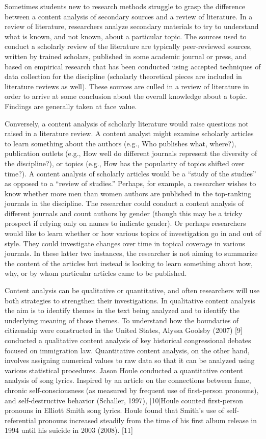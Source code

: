 Sometimes students new to research methods struggle to grasp the difference between a content analysis of secondary sources and a review of literature. In a review of literature, researchers analyze secondary materials to try to understand what is known, and not known, about a particular topic. The sources used to conduct a scholarly review of the literature are typically peer-reviewed sources, written by trained scholars, published in some academic journal or press, and based on empirical research that has been conducted using accepted techniques of data collection for the discipline (scholarly theoretical pieces are included in literature reviews as well). These sources are culled in a review of literature in order to arrive at some conclusion about the overall knowledge about a topic. Findings are generally taken at face value.

Conversely, a content analysis of scholarly literature would raise questions not raised in a literature review. A content analyst might examine scholarly articles to learn something about the authors (e.g., Who publishes what, where?), publication outlets (e.g., How well do different journals represent the diversity of the discipline?), or topics (e.g., How has the popularity of topics shifted over time?). A content analysis of scholarly articles would be a ``study of the studies'' as opposed to a ``review of studies.'' Perhaps, for example, a researcher wishes to know whether more men than women authors are published in the top-ranking journals in the discipline. The researcher could conduct a content analysis of different journals and count authors by gender (though this may be a tricky prospect if relying only on names to indicate gender). Or perhaps researchers would like to learn whether or how various topics of investigation go in and out of style. They could investigate changes over time in topical coverage in various journals. In these latter two instances, the researcher is not aiming to summarize the content of the articles but instead is looking to learn something about how, why, or by whom particular articles came to be published.

Content analysis can be qualitative or quantitative, and often researchers will use both strategies to strengthen their investigations. In qualitative content analysis the aim is to identify themes in the text being analyzed and to identify the underlying meaning of those themes. To understand how the boundaries of citizenship were constructed in the United States, Alyssa Goolsby (2007) [9] conducted a qualitative content analysis of key historical congressional debates focused on immigration law. Quantitative content analysis, on the other hand, involves assigning numerical values to raw data so that it can be analyzed using various statistical procedures. Jason Houle conducted a quantitative content analysis of song lyrics. Inspired by an article on the connections between fame, chronic self-consciousness (as measured by frequent use of first-person pronouns), and self-destructive behavior (Schaller, 1997), [10]Houle counted first-person pronouns in Elliott Smith song lyrics. Houle found that Smith’s use of self-referential pronouns increased steadily from the time of his first album release in 1994 until his suicide in 2003 (2008). [11]

